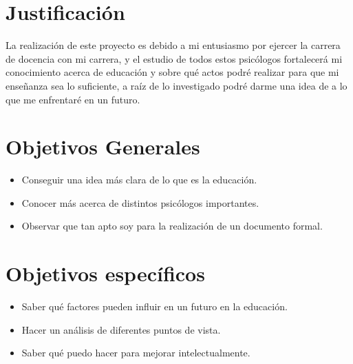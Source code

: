 \documentclass{bmcart}
\begin{document}
\section*{Justificación }
La realización de este proyecto es debido a mi entusiasmo por ejercer la carrera de docencia con mi carrera, y el estudio de todos estos psicólogos fortalecerá mi conocimiento acerca de educación y sobre qué actos podré realizar para que mi enseñanza sea lo suficiente, a raíz de lo investigado podré darme una idea de a lo que me enfrentaré en un futuro.

\section*{Objetivos Generales}
	\begin{itemize}
\item Conseguir una idea más clara de lo que es la educación.
\newline 
\item Conocer más acerca de distintos psicólogos importantes.
\newline 
\item Observar que tan apto soy para la realización de un documento formal.
	\end{itemize}
		
\section*{Objetivos específicos}
\begin{itemize}
\item Saber qué factores pueden influir en un futuro en la educación.
\newline 
\item Hacer un análisis de diferentes puntos de vista.
\newline 
\item Saber qué puedo hacer para mejorar intelectualmente.
	\end{itemize}

\newpage
\end{document}
